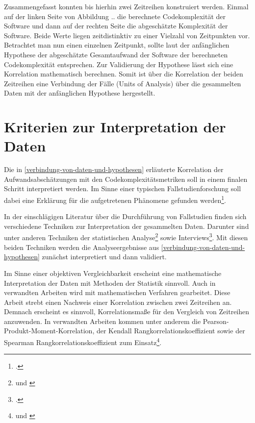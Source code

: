 Zusammengefasst konnten bis hierhin zwei Zeitreihen konstruiert werden.
Einmal auf der linken Seite von Abbildung .. die berechnete
Codekomplexität der Software und dann auf der rechten Seite die
abgeschätzte Komplexität der Software. Beide Werte liegen zeitdistinktiv
zu einer Vielzahl von Zeitpunkten vor. Betrachtet man nun einen
einzelnen Zeitpunkt, sollte laut der anfänglichen Hypothese der
abgeschätzte Gesamtaufwand der Software der berechneten Codekomplexität
entsprechen. Zur Validierung der Hypothese lässt sich eine Korrelation
mathematisch berechnen. Somit ist über die Korrelation der beiden
Zeitreihen eine Verbindung der Fälle (Units of Analysis) über die
gesammelten Daten mit der anfänglichen Hypothese hergestellt.

\section{Kriterien zur Interpretation der Daten}\label{kriterien-zur-interpretation-der-daten}

Die in \ref{verbindung-von-daten-und-hypothesen} erläuterte Korrelation der Aufwandsabschätzungen mit den
Codekomplexitätsmetriken soll in einem finalen Schritt interpretiert
werden. Im Sinne einer typischen Fallstudienforschung soll dabei eine
Erklärung für die aufgetretenen Phänomene gefunden werden\footcite[Vgl. ][S. 11]{gothlichFallstudienAlsForschungsmethode2003}.

In der einschlägigen Literatur über die Durchführung von Fallstudien
finden sich verschiedene Techniken zur Interpretation der gesammelten
Daten. Darunter sind unter anderen Techniken der statistischen Analyse\footnote{\cite[Vgl .][S. 79]{yinCaseStudyResearch2014} und \cite[][S. 11]{gothlichFallstudienAlsForschungsmethode2003}} sowie Interviews\footcite[Vgl. ][S. 11]{gothlichFallstudienAlsForschungsmethode2003}. Mit diesen beiden
Techniken werden die Analyseergebnisse aus \ref{verbindung-von-daten-und-hypothesen} zunächst interpretiert
und dann validiert.

Im Sinne einer objektiven Vergleichbarkeit erscheint eine mathematische
Interpretation der Daten mit Methoden der Statistik sinnvoll. Auch in
verwandten Arbeiten wird mit mathematischen Verfahren gearbeitet. Diese
Arbeit strebt einen Nachweis einer Korrelation zwischen zwei Zeitreihen
an. Demnach erscheint es sinnvoll, Korrelationsmaße für den Vergleich
von Zeitreihen anzuwenden. In verwandten Arbeiten kommen unter anderem
die Pearson-Produkt-Moment-Korrelation, der Kendall
Rangkorrelationskoeffizient sowie der Spearman
Rangkorrelationskoeffizient zum Einsatz\footnote{\cite[Vgl. ][S. 140]{jayCyclomaticComplexityLines2009} und \cite[][]{hindleReadingLinesUsing2009}}.

